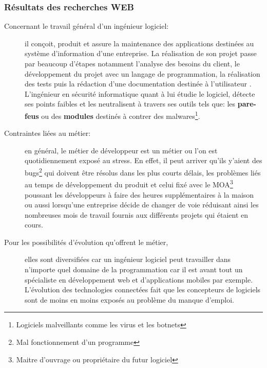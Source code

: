 \documentclass[11pt]{article}
\begin{document}
\begin{onehalfspace}
		\subsubsection{Résultats des recherches WEB}
		\begin{description}
			\item[Concernant le travail général d'un ingénieur logiciel: ] il conçoit, produit et assure la maintenance des applications destinées au système d'information d'une entreprise. La réalisation de son projet passe par beaucoup d'étapes notamment l'analyse des besoins du client, le développement du projet avec un langage de programmation, la réalisation des tests puis la rédaction d'une documentation destinée à l'utilisateur \cite{role1}. L'ingénieur en sécurité informatique quant à lui étudie le logiciel, détecte ses points faibles et les neutralisent à travers ses outils tels que: les \textbf{pare-feus} ou des \textbf{modules} destinés à contrer des malwares\footnote{Logiciels malveillants comme les virus et les botnets}\cite{securite}.
			\item[Contraintes liées au métier: ] en général, le métier de développeur est un métier ou l'on est quotidiennement exposé au stress. En effet, il peut arriver qu'ils y'aient des bugs\footnote{Mal fonctionnement d'un programme} qui doivent être résolus dans les plus courts délais, les problèmes liés au temps de développement du produit et celui fixé avec le MOA\footnote{Maitre d'ouvrage ou propriétaire du futur logiciel}\cite{genie_logicie} poussant les développeurs à faire des heures supplémentaires à la maison ou aussi lorsqu'une entreprise décide de changer de voie réduisant ainsi les nombreuses mois de travail fournis aux différents projets qui étaient en cours\cite{contraintes}.
			\item[Pour les possibilités d'évolution qu'offrent le métier,] elles sont diversifiées car un ingénieur logiciel peut travailler dans n'importe quel domaine de la programmation car il est avant tout un spécialiste en développement web et d'applications mobiles par exemple. L'évolution des technologies connectées fait que les concepteurs de logiciels sont de moins en moins exposés au problème du manque d'emploi.
			\begin{figure}[h]
				\begin{center}

\end{center}
\end{figure}
\end{description}
\end{onehalfspace}
\end{document}
